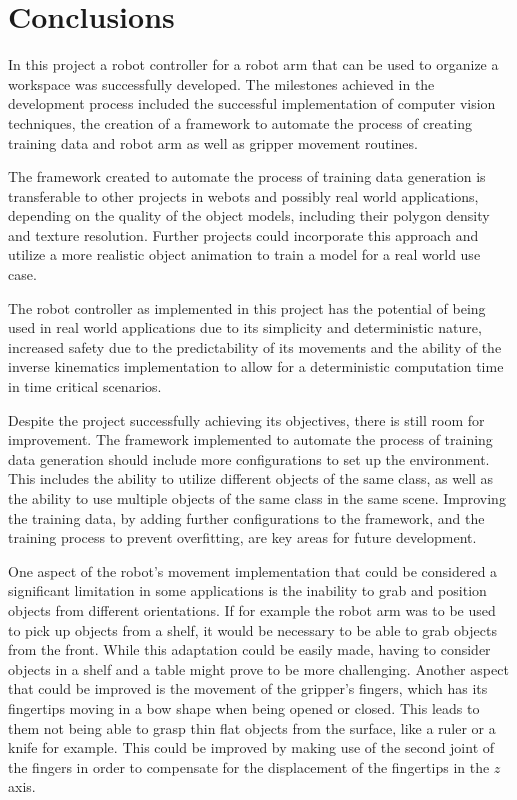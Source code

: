 
\chapter{Conclusions} %

\label{conclusions} %


In this project a robot controller for a robot arm that can be used to organize a workspace was successfully developed. The milestones achieved in the development process included the successful implementation of computer vision techniques, the creation of a framework to automate the process of creating training data and robot arm as well as gripper movement routines.

The framework created to automate the process of training data generation is transferable to other projects in webots and possibly real world applications, depending on the quality of the object models, including their polygon density and texture resolution. Further projects could incorporate this approach and utilize a more realistic object animation to train a model for a real world use case. 

The robot controller as implemented in this project has the potential of being used in real world applications due to its simplicity and deterministic nature, increased safety due to the predictability of its movements and the ability of the inverse kinematics implementation to allow for a deterministic computation time in time critical scenarios.

Despite the project successfully achieving its objectives, there is still room for improvement. The framework implemented to automate the process of training data generation should include more configurations to set up the environment. This includes the ability to utilize different objects of the same class, as well as the ability to use multiple objects of the same class in the same scene. Improving the training data, by adding further configurations to the framework, and the training process to prevent overfitting, are key areas for future development.

One aspect of the robot's movement implementation that could be considered a significant limitation in some applications is the inability to grab and position objects from different orientations. If for example the robot arm was to be used to pick up objects from a shelf, it would be necessary to be able to grab objects from the front. While this adaptation could be easily made, having to consider objects in a shelf and a table might prove to be more challenging. 
Another aspect that could be improved is the movement of the gripper's fingers, which has its fingertips moving in a bow shape when being opened or closed. This leads to them not being able to grasp thin flat objects from the surface, like a ruler or a knife for example. This could be improved by making use of the second joint of the fingers in order to compensate for the displacement of the fingertips in the \(z\) axis.


